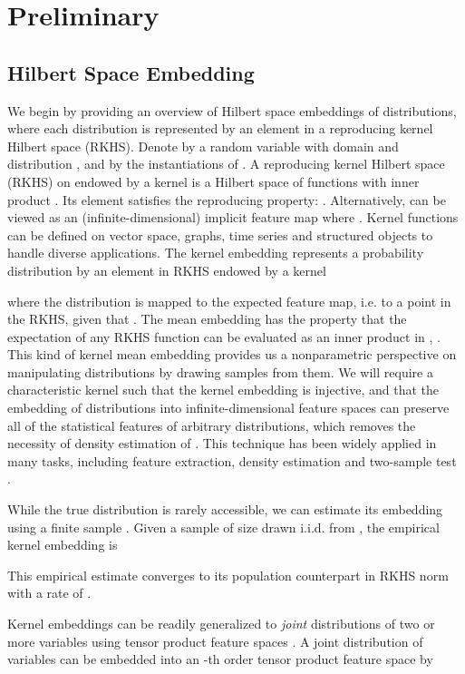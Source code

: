 \documentclass{article}
\begin{document}
\section{Preliminary}

\subsection{Hilbert Space Embedding}
We begin by providing an overview of Hilbert space embeddings of distributions, where each distribution is represented by an element in a reproducing kernel Hilbert space (RKHS). Denote by  a random variable with domain  and distribution , and by  the instantiations of .
A reproducing kernel Hilbert space (RKHS)  on  endowed by a kernel  is a Hilbert space of functions  with inner product . Its element  satisfies the reproducing property: . Alternatively,  can be viewed as an (infinite-dimensional) implicit feature map  where . 
Kernel functions can be defined on vector space, graphs, time series and structured objects to handle diverse applications. The kernel embedding represents a probability distribution  by an element in RKHS endowed by a kernel  \cite{cite:ALT07KSE,cite:JMLR10HSE,cite:JMLR12MMD}

where the distribution is mapped to the expected feature map, i.e. to a point in the RKHS, given that . The mean embedding  has the property that the expectation of any RKHS function  can be evaluated as an inner product in , . This kind of kernel mean embedding provides us a nonparametric perspective on manipulating distributions by drawing samples from them. We will require a characteristic kernel  such that the kernel embedding  is injective, and that the embedding of distributions into infinite-dimensional feature spaces can preserve all of the statistical features of arbitrary distributions, which removes the necessity of density estimation of . This technique has been widely applied in many tasks, including feature extraction, density estimation and two-sample test \cite{cite:ALT07KSE,cite:JMLR12MMD}.

While the true distribution  is rarely accessible, we can estimate
its embedding using a finite sample \cite{cite:JMLR12MMD}. Given a sample  of size  drawn i.i.d. from , the empirical kernel embedding is

This empirical estimate converges to its population counterpart in RKHS norm  with a rate of .

Kernel embeddings can be readily generalized to \emph{joint} distributions of two or more variables using tensor product feature spaces \cite{cite:ICML09HSE,cite:ICML10HSE,cite:NIPS13HSE}. A joint distribution  of variables  can be embedded into an -th order tensor product feature space  by
\end{document}
